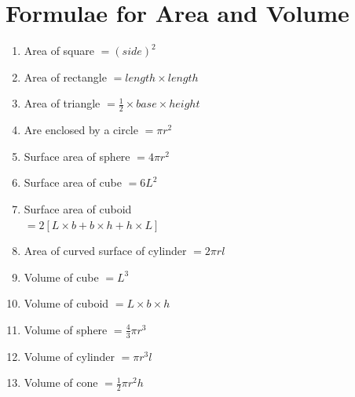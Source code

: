 \documentclass{article}
\begin{document}
\endgroup

\section{Formulae for Area and Volume}

\begin{multicols}{2}

\begin{enumerate}
    \item Area of square $=(side)^2$
    \item Area of rectangle $=length \times length$
    \item Area of triangle $=\frac{1}{2}\times base\times height$ 
    \item Are enclosed by a circle $=\pi r^2$
    \item Surface area of sphere $=4\pi r^2$
    \item Surface area of cube $=6L^2$
    \item Surface area of cuboid \\ $=2[L\times b + b\times h + h\times L]$
    \item Area of curved surface of cylinder $=2\pi rl$
    \item Volume of cube $=L^3$
    \item Volume of cuboid $=L\times b\times h$
    \item Volume of sphere $=\frac{4}{3}\pi r^3$
    \item Volume of cylinder $=\pi r^3 l$
    \item Volume of cone $=\frac{1}{2}\pi r^2 h$
\end{enumerate}

\end{multicols}
\end{document}
